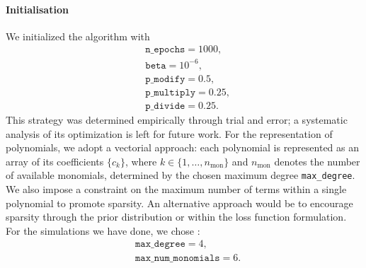 \documentclass[11pt]{article}
\begin{document}
\paragraph{Initialisation}
We initialized the algorithm with 
\begin{equation}	\label{eq:sample10000adaptativetemp}
	\begin{aligned}
		&\texttt{n\_epochs} = 1000,\\
		&\texttt{beta}  = 10^{-6}, \\
		&\texttt{p\_{modify}} = 0.5,\\
		&\texttt{p\_{multiply}} = 0.25,\\
		&\texttt{p\_{divide}} = 0.25. 
	\end{aligned}
\end{equation}
This strategy was determined empirically through trial and error; a systematic analysis of its optimization is left for future work. For the representation of polynomials, we adopt a vectorial approach: each polynomial is represented as an array of its coefficients $\{c_k\}$, where $k \in \{1,\dots,n_{\text{mon}}\}$ and $n_{\text{mon}}$ denotes the number of available monomials, determined by the chosen maximum degree \texttt{max\_degree}. We also impose a constraint on the maximum number of terms within a single polynomial to promote sparsity. An alternative approach would be to encourage sparsity through the prior distribution or within the loss function formulation. For the simulations we have done, we chose : 
\begin{equation} \label{eq:parampol}
	\begin{aligned}
		&\texttt{max\_degree} = 4,\\
		&\texttt{max\_num\_monomials} = 6.
	\end{aligned}
\end{equation}
\end{document}
